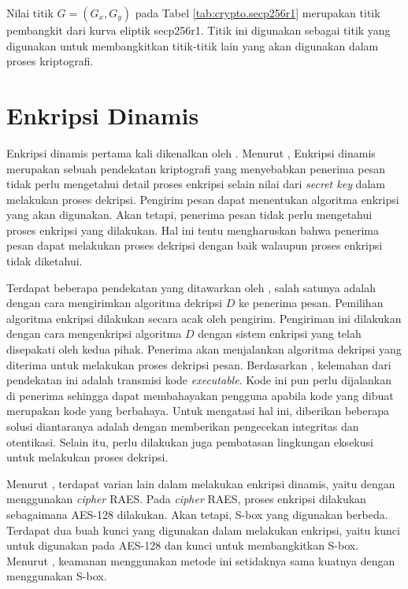 Nilai titik $G = (G_x, G_y)$ pada Tabel \ref{tab:crypto.secp256r1} merupakan titik pembangkit dari kurva eliptik secp256r1. Titik ini digunakan sebagai titik yang digunakan untuk membangkitkan titik-titik lain yang akan digunakan dalam proses kriptografi.

\section{Enkripsi Dinamis}
Enkripsi dinamis pertama kali dikenalkan oleh \textcite{knudsen2015}. Menurut \textcite{knudsen2015}, Enkripsi dinamis merupakan sebuah pendekatan kriptografi yang menyebabkan penerima pesan tidak perlu mengetahui detail proses enkripsi selain nilai dari \emph{secret key} dalam melakukan proses dekripsi. Pengirim pesan dapat menentukan algoritma enkripsi yang akan digunakan. Akan tetapi, penerima pesan tidak perlu mengetahui proses enkripsi yang dilakukan. Hal ini tentu mengharuskan bahwa penerima pesan dapat melakukan proses dekripsi dengan baik walaupun proses enkripsi tidak diketahui. 

Terdapat beberapa pendekatan yang ditawarkan oleh \textcite{knudsen2015}, salah satunya adalah dengan cara mengirimkan algoritma dekripsi $D$ ke penerima pesan. Pemilihan algoritma enkripsi dilakukan secara acak oleh pengirim. Pengiriman ini dilakukan dengan cara mengenkripsi algoritma $D$ dengan sistem enkripsi yang telah disepakati oleh kedua pihak. Penerima akan menjalankan algoritma dekripsi yang diterima untuk melakukan proses dekripsi pesan. Berdasarkan \textcite{knudsen2015}, kelemahan dari pendekatan ini adalah transmisi kode \emph{executable}. Kode ini pun perlu dijalankan di penerima sehingga dapat membahayakan pengguna apabila kode yang dibuat merupakan kode yang berbahaya. Untuk mengatasi hal ini, diberikan beberapa solusi diantaranya adalah dengan memberikan pengecekan integritas dan otentikasi. Selain itu, perlu dilakukan juga pembatasan lingkungan eksekusi untuk melakukan proses dekripsi.

Menurut \textcite{knudsen2015}, terdapat varian lain dalam melakukan enkripsi dinamis, yaitu dengan menggunakan \emph{cipher} RAES. Pada \emph{cipher} RAES, proses enkripsi dilakukan sebagaimana AES-128 dilakukan. Akan tetapi, S-box yang digunakan berbeda. Terdapat dua buah kunci yang digunakan dalam melakukan enkripsi, yaitu kunci untuk digunakan pada AES-128 dan kunci untuk membangkitkan S-box. Menurut \textcite{knudsen2015}, keamanan menggunakan metode ini setidaknya sama kuatnya dengan menggunakan S-box.

